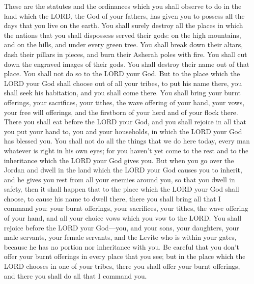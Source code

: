  These are the statutes and the ordinances which you shall
observe to do in the land which the LORD, the God of your fathers, has
given you to possess all the days that you live on the earth.
 You shall surely destroy all the places in which the
nations that you shall dispossess served their gods: on the high
mountains, and on the hills, and under every green tree. 
You shall break down their altars, dash their pillars in pieces, and
burn their Asherah poles with fire. You shall cut down the engraved
images of their gods. You shall destroy their name out of that place.
 You shall not do so to the LORD your God.  But
to the place which the LORD your God shall choose out of all your
tribes, to put his name there, you shall seek his habitation, and you
shall come there.  You shall bring your burnt offerings,
your sacrifices, your tithes, the wave offering of your hand, your vows,
your free will offerings, and the firstborn of your herd and of your
flock there.  There you shall eat before the LORD your God,
and you shall rejoice in all that you put your hand to, you and your
households, in which the LORD your God has blessed you.  You
shall not do all the things that we do here today, every man whatever is
right in his own eyes;  for you haven't yet come to the rest
and to the inheritance which the LORD your God gives you. 
But when you go over the Jordan and dwell in the land which the LORD
your God causes you to inherit, and he gives you rest from all your
enemies around you, so that you dwell in safety,  then it
shall happen that to the place which the LORD your God shall choose, to
cause his name to dwell there, there you shall bring all that I command
you: your burnt offerings, your sacrifices, your tithes, the wave
offering of your hand, and all your choice vows which you vow to the
LORD.  You shall rejoice before the LORD your God---you,
and your sons, your daughters, your male servants, your female servants,
and the Levite who is within your gates, because he has no portion nor
inheritance with you.  Be careful that you don't offer your
burnt offerings in every place that you see;  but in the
place which the LORD chooses in one of your tribes, there you shall
offer your burnt offerings, and there you shall do all that I command
you.

